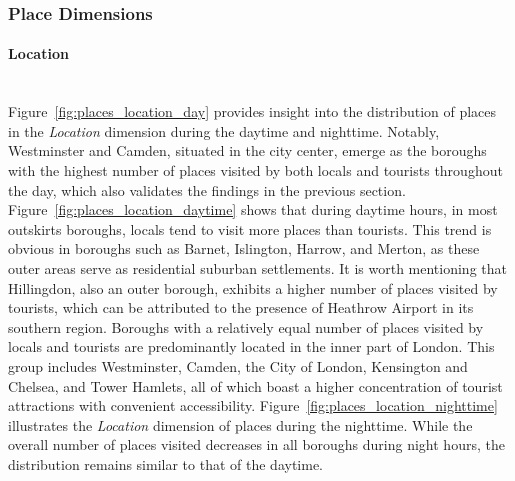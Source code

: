 \documentclass{article}
\newcommand{\subsubsubsection}[1]{\paragraph{#1}\mbox{}\\}
\theoremstyle{definition}
\theoremstyle{remark}
\begin{document}
\subsubsection{Place Dimensions}

\subsubsubsection{Location}
Figure~\ref{fig:places_location_day} provides insight into the distribution of places in the \textit{Location} dimension during the daytime and nighttime. Notably, Westminster and Camden, situated in the city center, emerge as the boroughs with the highest number of places visited by both locals and tourists throughout the day, which also validates the findings in the previous section. Figure~\ref{fig:places_location_daytime} shows that during daytime hours, in most outskirts boroughs, locals tend to visit more places than tourists. This trend is obvious in boroughs such as Barnet, Islington, Harrow, and Merton, as these outer areas serve as residential suburban settlements. It is worth mentioning that Hillingdon, also an outer borough, exhibits a higher number of places visited by tourists, which can be attributed to the presence of Heathrow Airport in its southern region. Boroughs with a relatively equal number of places visited by locals and tourists are predominantly located in the inner part of London. This group includes Westminster, Camden, the City of London, Kensington and Chelsea, and Tower Hamlets, all of which boast a higher concentration of tourist attractions with convenient accessibility. Figure~\ref{fig:places_location_nighttime} illustrates the \textit{Location} dimension of places during the nighttime. While the overall number of places visited decreases in all boroughs during night hours, the distribution remains similar to that of the daytime.
\end{document}
